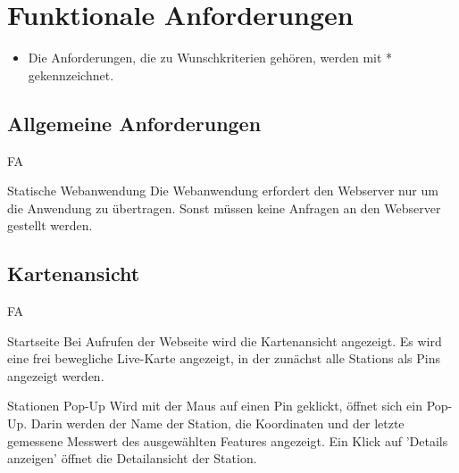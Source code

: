 \section{Funktionale Anforderungen}

\begin{itemize}
  \item Die Anforderungen, die zu Wunschkriterien gehören, werden mit * gekennzeichnet.
\end{itemize}

\setcounter{counter}{10}

\subsection{Allgemeine Anforderungen}

\begin{Kriterien}{FA}
  \item[Statische Webanwendung]
    Die \gls{Webanwendung} erfordert den \gls{Webserver} nur um die Anwendung zu übertragen.
    Sonst müssen keine Anfragen an den \gls{Webserver} gestellt werden. 
\end{Kriterien}


\subsection{Kartenansicht}

\begin{Kriterien}{FA}
  \item[Startseite]
    Bei Aufrufen der Webseite wird die \gls{Kartenansicht} angezeigt. Es wird eine frei bewegliche \gls{Live-Karte} 
    angezeigt, in der zunächst alle \glspl{Station} als \glspl{Pin} angezeigt werden.

  \item[Stationen Pop-Up]
    Wird mit der Maus auf einen \gls{Pin} geklickt, öffnet sich ein \gls{Pop-Up}. Darin werden der Name der \gls{Station}, 
    die Koordinaten und der letzte gemessene \gls{Messwert} des ausgewählten \glspl{Feature} angezeigt. Ein Klick auf 
    'Details anzeigen' öffnet die \gls{Detailansicht} der \gls{Station}.
\end{Kriterien}

